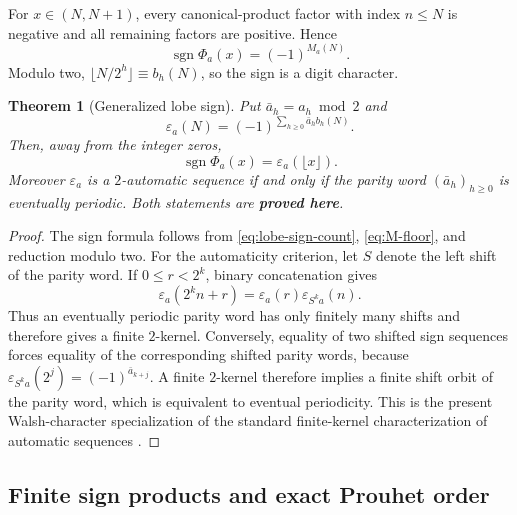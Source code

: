 \documentclass[11pt,oneside]{article}
\numberwithin{equation}{section}
\newtheorem{theorem}{Theorem}[section]
\theoremstyle{definition}
\theoremstyle{remark}
\newcommand{\sgn}{\operatorname{sgn}}
\newcommand{\statusproved}{\textcolor{deepgreen}{\textbf{proved here}}}
\begin{document}
For $x\in(N,N+1)$, every canonical-product factor with index $n\le N$ is negative and all
remaining factors are positive.  Hence
\begin{equation}
 \sgn\Phi_a(x)=(-1)^{M_a(N)}.
 \label{eq:lobe-sign-count}
\end{equation}
Modulo two,
$\lfloor N/2^h\rfloor\equiv b_h(N)$, so the sign is a digit character.

\begin{theorem}[Generalized lobe sign]
\label{thm:lobe-sign}
Put $\bar a_h=a_h\bmod2$ and
\begin{equation}
 \varepsilon_a(N)=(-1)^{\sum_{h\ge0}\bar a_hb_h(N)}.
 \label{eq:epsilon-a}
\end{equation}
Then, away from the integer zeros,
\begin{equation}
 \boxed{\qquad \sgn\Phi_a(x)=\varepsilon_a(\lfloor x\rfloor).\qquad}
 \label{eq:sign-master}
\end{equation}
Moreover $\varepsilon_a$ is a $2$-automatic sequence if and only if the parity word
$(\bar a_h)_{h\ge0}$ is eventually periodic.  Both statements are \statusproved.
\end{theorem}

\begin{proof}
The sign formula follows from \eqref{eq:lobe-sign-count}, \eqref{eq:M-floor}, and reduction
modulo two.  For the automaticity criterion, let $S$ denote the left shift of the parity
word.  If $0\le r<2^k$, binary concatenation gives
\begin{equation}
 \varepsilon_a(2^kn+r)=\varepsilon_a(r)\varepsilon_{S^ka}(n).
 \label{eq:kernel-shift}
\end{equation}
Thus an eventually periodic parity word has only finitely many shifts and therefore gives a
finite $2$-kernel.  Conversely, equality of two shifted sign sequences forces equality of
the corresponding shifted parity words, because
$\varepsilon_{S^ka}(2^j)=(-1)^{\bar a_{k+j}}$.  A finite $2$-kernel therefore implies a
finite shift orbit of the parity word, which is equivalent to eventual periodicity.  This is
the present Walsh-character specialization of the standard finite-kernel characterization
of automatic sequences \cite{alloucheShallit}.
\end{proof}

\subsection{Finite sign products and exact Prouhet order}
\end{document}

